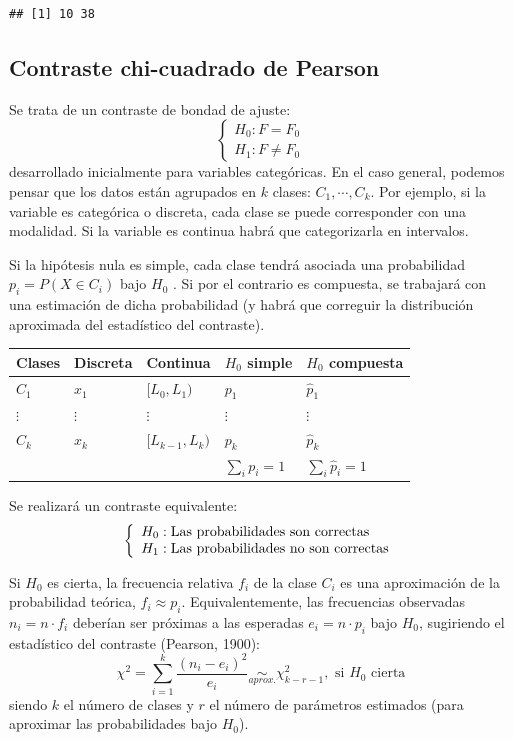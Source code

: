 \documentclass[
]{book}
\theoremstyle{break}
\theoremstyle{definition}
\theoremstyle{definition}
\theoremstyle{definition}
\theoremstyle{definition}
\theoremstyle{remark}
\begin{document}
\begin{verbatim}
## [1] 10 38
\end{verbatim}

\hypertarget{chi2test}{%
\subsection{Contraste chi-cuadrado de Pearson}\label{chi2test}}

Se trata de un contraste de bondad de ajuste:
\[\left \{
\begin{array}{l}
H_0:F=F_0\\
H_1:F\neq F_0\end{array}
\right.\]
desarrollado inicialmente para variables categóricas. En el caso general, podemos pensar que los datos están agrupados en \(k\) clases: \(C_1,\cdots,C_{k}\). Por ejemplo, si la variable es categórica o discreta, cada clase se puede corresponder con una modalidad. Si la variable es continua habrá que categorizarla en intervalos.

Si la hipótesis nula es simple, cada clase tendrá asociada una probabilidad \(p_{i}=P\left( X\in C_{i} \right)\) bajo \(H_0\) . Si por el contrario es compuesta, se trabajará con una estimación de dicha probabilidad (y habrá que correguir la distribución aproximada del estadístico del contraste).

\begin{longtable}[]{@{}lllll@{}}
\toprule
Clases & Discreta & Continua & \(H_0\) simple & \(H_0\) compuesta \\
\midrule
\endhead
\(C_1\) & \(x_1\) & \([L_0,L_1)\) & \(p_1\) & \(\hat{p}_1\) \\
\(\vdots\) & \(\vdots\) & \(\vdots\) & \(\vdots\) & \(\vdots\) \\
\(C_{k}\) & \(x_{k}\) & \([L_{k-1},L_{k})\) & \(p_{k}\) & \(\hat{p}_{k}\) \\
& & & \(\sum_{i}p_{i}=1\) & \(\sum_{i}\hat{p}_{i}=1\) \\
\bottomrule
\end{longtable}

Se realizará un contraste equivalente:
\[\left\{ \begin{array}[c]{l}
H_0:\text{Las probabilidades son correctas}\\
H_1:\text{Las probabilidades no son correctas}
\end{array} \right.\]

Si \(H_0\) es cierta, la frecuencia relativa \(f_{i}\) de la clase \(C_{i}\) es una aproximación de la probabilidad teórica, \(f_{i}\approx p_{i}\).
Equivalentemente, las frecuencias observadas \(n_{i}=n\cdot f_{i}\) deberían ser próximas a las esperadas \(e_{i}=n\cdot p_{i}\) bajo \(H_0\), sugiriendo el estadístico del contraste (Pearson, 1900):
\[\chi^2=\sum_{i=1}^{k}\frac{(n_{i}-e_{i})^2}{e_{i}}\underset{aprox.}{\sim
}\chi_{k-r-1}^2,\text{ si }H_0\text{ cierta}\]
siendo \(k\) el número de clases y \(r\) el número de parámetros estimados (para aproximar las probabilidades bajo \(H_0\)).
\end{document}
